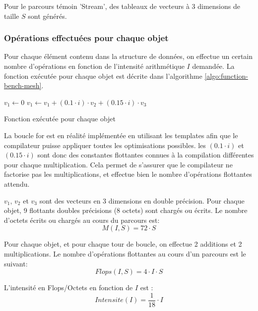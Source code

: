 Pour le parcours témoin 'Stream', des tableaux de vecteurs à 3 dimensions de taille $S$ sont générés.

\subsubsection{Opérations effectuées pour chaque objet}

Pour chaque élément contenu dans la structure de données, on effectue un certain nombre d'opérations en fonction de l'intensité arithmétique $I$ demandée. La fonction exécutée pour chaque objet est décrite dans l'algorithme \ref{algo:function-bench-mesh}. 

\begin{algorithm}[H]
	\SetAlgoLined
	\LinesNumbered
	\SetAlgoNoEnd	
	\DontPrintSemicolon
	
	$v_1 \leftarrow 0$\;
	{
		$v_1 \leftarrow v_1 + (0.1 \cdot i )\cdot v_2 + (0.15 \cdot i) \cdot v_3$\;
	}
	
	\caption{Fonction exécutée pour chaque objet}
\end{algorithm}

La boucle for est en réalité implémentée en utilisant les templates afin que le compilateur puisse appliquer toutes les optimisations possibles. les $(0.1 \cdot i)$ et $(0.15 \cdot i)$ sont donc des constantes flottantes connues à la compilation différentes pour chaque multiplication. Cela permet de s'assurer que le compilateur ne factorise pas les multiplications, et effectue bien le nombre d'opérations flottantes attendu.

$v_1$, $v_2$ et $v_3$ sont des vecteurs en 3 dimensions en double précision. Pour chaque objet, 9 flottants doubles précisions (8 octets) sont chargés ou écrits. Le nombre d'octets écrits ou chargés au cours du parcours est:
\begin{equation}
	M(I,S) = 72 \cdot S
\end{equation}

Pour chaque objet, et pour chaque tour de boucle, on effectue 2 additions et 2 multiplications. Le nombre d'opérations flottantes au cours d'un parcours est le suivant:
\begin{equation}
	Flops(I,S) = 4 \cdot I \cdot S
\end{equation}

L'intensité en Flops/Octets en fonction de $I$ est :
\begin{equation}
	Intensite(I) = \frac{1}{18} \cdot I
\end{equation}

